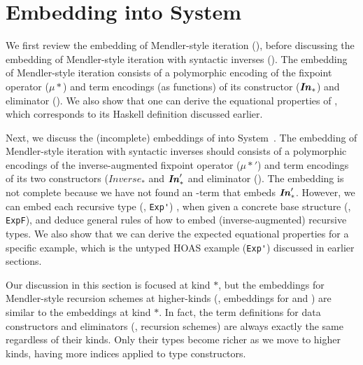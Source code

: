 \section{Embedding \msfit{} into System~\Fw{}}\label{sec:theory}

We first review the embedding of Mendler-style iteration (\MIt{*}),
before discussing the embedding of Mendler-style iteration with
syntactic inverses (\msfit{*}). The embedding of Mendler-style iteration
consists of a polymorphic encoding of the fixpoint operator ($\mu{*}$)
and term encodings (as functions) of its constructor ($\textbf{\textit{In}}_{*}$)
and eliminator (\MIt{*}). We also show that one can derive
the equational properties of \MIt{*}, which corresponds to
its Haskell definition discussed earlier.

Next, we discuss the (incomplete) embeddings of \msfit{*} into System~\Fw.
The embedding of Mendler-style iteration with syntactic inverses should
consists of a polymorphic encodings of the inverse-augmented fixpoint operator
($\mu{*}'$) and term encodings of its two constructors ($\textit{Inverse}_{*}$
and $\textbf{\textit{In}}_{*}'$ and eliminator (\msfit{*}). The embedding is not complete
because we have not found an \Fw-term that embeds $\textbf{\textit{In}}_{*}'$. However,
we can embed each recursive type (\eg, \lstinline{Exp'}) , when given
a concrete base structure (\eg, \lstinline{ExpF}), and deduce general rules
of how to embed (inverse-augmented) recursive types. We also show that we
can derive the expected equational properties for a specific example,
which is the untyped HOAS example (\lstinline{Exp'}) discussed
in earlier sections.

Our discussion in this section is focused at kind $*$, but the embeddings for
Mendler-style recursion schemes at higher-kinds (\eg, embeddings for
\MIt{*\to*} and \msfit{*\to*}) are similar to the embeddings at kind $*$.
In fact, the term definitions for data constructors and eliminators
(\ie, recursion schemes) are always exactly the same regardless of their kinds.
Only their types become richer as we move to higher kinds, having more indices
applied to type constructors.

